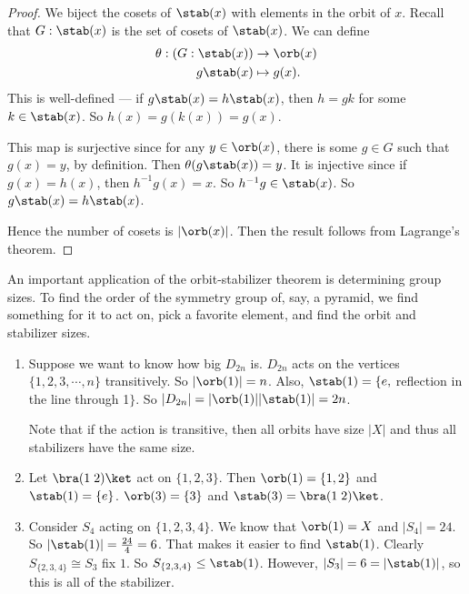 \documentclass[a4paper]{article}
\begin{document}
\begin{proof}
  We biject the cosets of $\stab(x)$ with elements in the orbit of $x$. Recall that $G: \stab(x)$ is the set of cosets of $\stab(x)$. We can define
  \begin{align*}
    \theta: (G:\stab(x))& \to \orb(x)\\
    g\stab(x) &\mapsto g(x).
  \end{align*}
  This is well-defined --- if $g\stab(x) = h\stab(x)$, then $h = gk$ for some $k\in \stab(x)$. So $h(x) = g(k(x)) = g(x)$.

  This map is surjective since for any $y\in \orb(x)$, there is some $g \in G$ such that $g(x) = y$, by definition. Then $\theta(g \stab(x)) = y$. It is injective since if $g(x) = h(x)$, then $h^{-1}g(x) = x$. So $h^{-1}g\in \stab (x)$. So $g\stab(x) = h\stab(x)$.

  Hence the number of cosets is $|\orb(x)|$. Then the result follows from Lagrange's theorem.
\end{proof}
An important application of the orbit-stabilizer theorem is determining group sizes. To find the order of the symmetry group of, say, a pyramid, we find something for it to act on, pick a favorite element, and find the orbit and stabilizer sizes.

\begin{eg}\leavevmode
  \begin{enumerate}
    \item Suppose we want to know how big $D_{2n}$ is. $D_{2n}$ acts on the vertices $\{1, 2, 3, \cdots, n\}$ transitively. So $|\orb(1)| = n$. Also, $\stab(1) =\{e, $ reflection in the line through 1$\}$. So $|D_{2n}| = |\orb(1)||\stab(1)| = 2n$.

      Note that if the action is transitive, then all orbits have size $|X|$ and thus all stabilizers have the same size.
    \item Let $\bra (1\; 2)\ket$ act on $\{1, 2, 3\}$. Then $\orb(1) = \{1, 2\}$ and $\stab(1) = \{e\}$. $\orb(3) = \{3\}$ and $\stab(3) = \bra(1\; 2)\ket$.
    \item Consider $S_4$ acting on $\{1, 2, 3, 4\}$. We know that $\orb(1) = X$ and $|S_4| = 24$. So $|\stab(1)| = \frac{24}{4} = 6$. That makes it easier to find $\stab(1)$. Clearly $S_{\{2, 3, 4\}} \cong S_3$ fix $1$. So $S_{\{2, 3, 4\}}\leq \stab(1)$. However, $|S_3| = 6 = |\stab(1)|$, so this is all of the stabilizer.
  \end{enumerate}
\end{eg}
\end{document}
